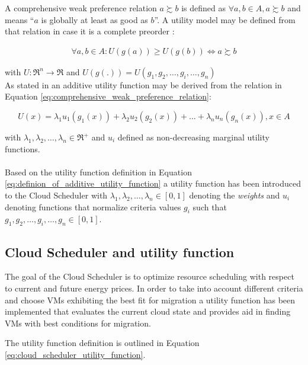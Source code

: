 A comprehensive weak preference relation $a \succsim b$ is defined as $\forall a,b \in A, a \succsim b$ and means ``$a$ is globally at least as good as
$b$''. 
A utility model may be defined from that relation in case it is a complete preorder \cite{angilella2004assessing}:

\begin{align}
	\forall a,b \in A: U(g(a)) \geq U(g(b)) \Leftrightarrow a \succsim b \label{eq:comprehensive_weak_preference_relation}
\end{align}	

with $U : \mathfrak{R}^n \rightarrow \mathfrak{R}$ and $U(g(.)) = U(g_1,g_2,\ldots,g_i,\ldots,g_n)$ \\
As stated in \cite{angilella2004assessing} an additive utility function may be derived from the relation in Equation \ref{eq:comprehensive_weak_preference_relation}:

\begin{equation}
	U(x) = \lambda_1 u_1 (g_1(x)) + \lambda_2 u_2 (g_2(x)) + \ldots + \lambda_n u_n (g_n(x)), x \in A
\label{eq:definion_of_additive_utility_function}
\end{equation}

with $\lambda_1,\lambda_2,\ldots,\lambda_n \in \mathfrak{R}^+$ and $u_i$ defined as non-decreasing marginal utility functions. \\
\\
Based on the utility function definition in Equation \ref{eq:definion_of_additive_utility_function} a utility function has been introduced to the Cloud Scheduler with $\lambda_1,\lambda_2,\ldots,\lambda_n \in [0,1]$ denoting the \textit{weights} and $u_i$ denoting functions that normalize criteria values $g_i$ such that $g_1,g_2,\ldots,g_i,\ldots,g_n \in [0,1]$. 




\subsection{Cloud Scheduler and utility function}

The goal of the Cloud Scheduler is to optimize resource scheduling with respect to current and future energy prices. In order to take into account different criteria and choose VMs exhibiting the best fit for migration a utility function has been implemented that evaluates the current cloud state and provides aid in finding VMs with best conditions for migration. 

The utility function definition is outlined in Equation \ref{eq:cloud_scheduler_utility_function}. 

